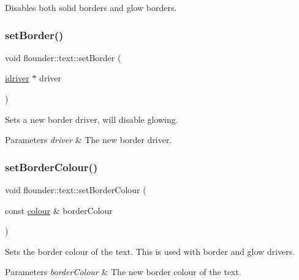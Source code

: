 Disables both solid borders and glow borders. 

\mbox{\label{classflounder_1_1text_abe7f908c5a19f4994555ceb18e6acd01}} 
\subsubsection{\texorpdfstring{set\+Border()}{setBorder()}}
{\footnotesize\ttfamily void flounder\+::text\+::set\+Border (\begin{DoxyParamCaption}\item[{\hyperlink{classflounder_1_1idriver}{idriver} $\ast$}]{driver }\end{DoxyParamCaption})}



Sets a new border driver, will disable glowing. 


\begin{DoxyParams}{Parameters}
{\em driver} & The new border driver. \\
\hline
\end{DoxyParams}
\mbox{\label{classflounder_1_1text_a6ea3ea5312d5873c1a64cd9b3efc8deb}} 
\subsubsection{\texorpdfstring{set\+Border\+Colour()}{setBorderColour()}}
{\footnotesize\ttfamily void flounder\+::text\+::set\+Border\+Colour (\begin{DoxyParamCaption}\item[{const \hyperlink{classflounder_1_1colour}{colour} \&}]{border\+Colour }\end{DoxyParamCaption})\hspace{0.3cm}{\ttfamily [inline]}}



Sets the border colour of the text. This is used with border and glow drivers. 


\begin{DoxyParams}{Parameters}
{\em border\+Colour} & The new border colour of the text. \\
\hline
\end{DoxyParams}
\mbox{\label{classflounder_1_1text_a09b4a646005f50e7b73e6eed5b0492ad}} 
